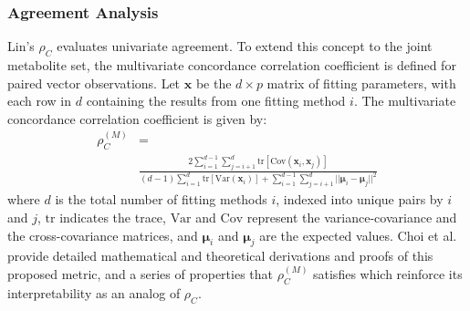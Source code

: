 \subsubsection{Agreement Analysis}
\label{sec:Eval:subsec:multivariate:subsubsec:agreement}
Lin's $\rho_C$ evaluates univariate agreement. To extend this concept to the joint metabolite set, the multivariate concordance correlation coefficient \cite{Choi2025} is defined for paired vector observations. Let $\boldsymbol{x}$ be the $d \times p$ matrix of fitting parameters, with each row in $d$ containing the results from one fitting method $i$. 
The multivariate concordance correlation coefficient is given by:
\begin{equation}\label{eqn:multivariate rho_c}
\begin{aligned}    
    \rho_C^{(M)}& = \\ &\frac{2\sum\limits_{i=1}^{d-1}\sum\limits_{j=i+1}^d \text{tr}\left[\text{Cov}(\boldsymbol{x}_i,\boldsymbol{x}_j) \right]}{(d-1)\sum\limits_{i=1}^d \text{tr}[\text{Var}(\boldsymbol{x}_i)]+\sum\limits_{i=1}^{d-1}\sum\limits_{j=i+1}^d||\boldsymbol{\mu}_i-\boldsymbol{\mu}_j||^2}
\end{aligned}
\end{equation}
\noindent where $d$ is the total number of fitting methods $i$, indexed into unique pairs by $i$ and $j$, $\text{tr}$ indicates the trace, $\text{Var}$ and $\text{Cov}$ represent the variance-covariance and the cross-covariance matrices, and $\boldsymbol{\mu}_i$ and $\boldsymbol{\mu}_j$ are the expected values. Choi et al.~\cite{Choi2025} provide detailed mathematical and theoretical derivations and proofs of this proposed metric, and a series of properties that $\rho_C^{(M)}$ satisfies which reinforce its interpretability as an analog of $\rho_C$.

